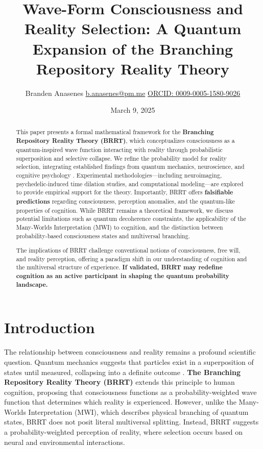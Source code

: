 \documentclass{article}
\title{Wave-Form Consciousness and Reality Selection: A Quantum Expansion of the Branching Repository Reality Theory}
\author{Branden Anasenes \href{mailto:b.anasenes@pm.me}{b.anasenes@pm.me} \href{https://orcid.org/0009-0005-1580-9026}{ORCID: 0009-0005-1580-9026}}
\date{March 9, 2025}
\begin{document}
\maketitle

\begin{abstract}
This paper presents a formal mathematical framework for the \textbf{Branching Repository Reality Theory (BRRT)}, which conceptualizes consciousness as a quantum-inspired wave function interacting with reality through probabilistic superposition and selective collapse. We refine the probability model for reality selection, integrating established findings from quantum mechanics, neuroscience, and cognitive psychology \cite{schrodinger1935present, fisher2015quantum, carhart2012neural}. Experimental methodologies—including neuroimaging, psychedelic-induced time dilation studies, and computational modeling—are explored to provide empirical support for the theory. Importantly, BRRT offers \textbf{falsifiable predictions} regarding consciousness, perception anomalies, and the quantum-like properties of cognition. While BRRT remains a theoretical framework, we discuss potential limitations such as quantum decoherence constraints, the applicability of the Many-Worlds Interpretation (MWI) to cognition, and the distinction between probability-based consciousness states and multiversal branching. 

The implications of BRRT challenge conventional notions of consciousness, free will, and reality perception, offering a paradigm shift in our understanding of cognition and the multiversal structure of experience. \textbf{If validated, BRRT may redefine cognition as an active participant in shaping the quantum probability landscape.}
\end{abstract}

\section{Introduction}
The relationship between consciousness and reality remains a profound scientific question. Quantum mechanics suggests that particles exist in a superposition of states until measured, collapsing into a definite outcome \cite{everett1957relative}. \textbf{The Branching Repository Reality Theory (BRRT)} extends this principle to human cognition, proposing that consciousness functions as a probability-weighted wave function that determines which reality is experienced. However, unlike the Many-Worlds Interpretation (MWI), which describes physical branching of quantum states, BRRT does not posit literal multiversal splitting. Instead, BRRT suggests a probability-weighted perception of reality, where selection occurs based on neural and environmental interactions.
\end{document}
